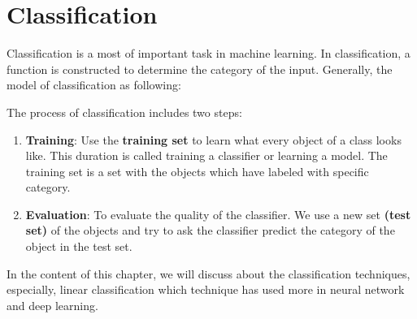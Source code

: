 \chapter{Classification}
Classification is a most of important task in machine learning. In classification, a function is constructed to determine the category of the input. Generally, the model of classification as following:

The process of classification includes two steps:
\begin{enumerate}
	\item \textbf{Training}: Use the \textbf{training set} to learn what every object of a class looks like. This duration is called training a classifier or learning a model. The training set is a set with the objects which have labeled with specific category.
	\item \textbf{Evaluation}: To evaluate the quality of the classifier. We use a new set \textbf{(test set)} of the objects and try to ask the classifier predict the category of the object in the test set.
\end{enumerate}
In the content of this chapter, we will discuss about the classification techniques, especially, linear classification which technique has used more in neural network and deep learning.
